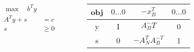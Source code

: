 \documentclass[t]{beamer}
\begin{document}
\begin{frame}
    \begin{columns}[T,onlytextwidth]

        \begin{column}{.3\textwidth}
            \begin{align*}
            \max \quad b^T y \\
            A^Ty + s &= c \\
            s &\geq 0 
            \end{align*}
        \end{column}

        \begin{column}{.6\textwidth}
            \renewcommand{\arraystretch}{2.2}
            \begin{tabular}{|c|c:c:c|}
                \hline
                obj     & $0\dots0$ & $-x_B^T$          & $0\dots0$\\\hline
                y       & I         & $A_B^-T$        & 0\\\hdashline
                s       & 0         & $-A_N^TA_B^{-T}$  & 1\\\hline
            \end{tabular}
        \end{column}        

    \end{columns}
\end{frame}
\end{document}
